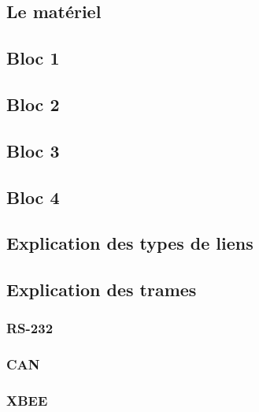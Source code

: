 \documentclass[10pt,a4paper,final]{article}
\begin{document}
\begin{spacing}{1.5}


\section{Le matériel}
\subsection{Bloc 1}

\subsection{Bloc 2}

\subsection{Bloc 3}

\subsection{Bloc 4}



\subsection{Explication des types de liens}



\subsection{Explication des trames}
\subsubsection{RS-232}

\subsubsection{CAN}

\subsubsection{XBEE}





\end{spacing}
\end{document}
